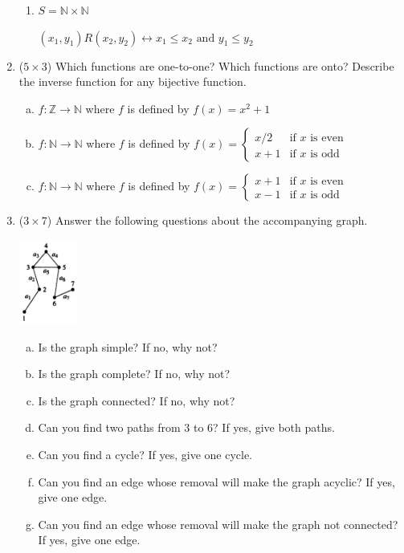 \documentclass[12pt]{article}
\newcommand{\ro}{R}
\begin{document}
\begin{enumerate}
\begin{enumerate}
						\item
						$S = \mathbb{N} \times \mathbb{N}$
						
						$\left(x_1, y_1\right) \ro \left(x_2, y_2\right) \leftrightarrow x_1 \leq x_2 \text{ and } y_1 \leq y_2$
					\end{enumerate} 
				
				
				\newpage
				\item ($5 \times 3$)
				Which functions are one-to-one? Which functions are onto? Describe the inverse function for any bijective function.
				\begin{enumerate}[a.]
					\item
					$f: \mathbb{Z} \to \mathbb{N}$ where $f$ is defined by $f\left(x\right) = x^2 +1$
					
					\item
					$f: \mathbb{N} \to \mathbb{N}$ where $f$ is defined by $f\left(x\right) = \left\lbrace 
					\begin{array}{ll}
					x/2 & \mbox{if } x \mbox{ is even } \\
					x + 1 & \mbox{if } x \mbox{ is odd } 
					\end{array}
					\right.$
					
					\item
					$f: \mathbb{N} \to \mathbb{N}$ where $f$ is defined by $f\left(x\right) = \left\lbrace 
					\begin{array}{ll}
					x + 1 & \mbox{if } x \mbox{ is even } \\
					x - 1 & \mbox{if } x \mbox{ is odd } 
					\end{array}
					\right.$
				\end{enumerate}		
			
		
		\newpage
		\item ($3 \times 7$)		
		Answer the following questions about the accompanying graph.
		\begin{center}
			\includegraphics[width=0.15\textwidth]{HW10-1}
		\end{center}			
		\begin{enumerate}[a.]
			\item			
			Is the graph simple? If no, why not?
			\item
			Is the graph complete? If no, why not?
			\item
			Is the graph connected? If no, why not?
			\item
			Can you find two paths from 3 to 6? If yes, give both paths.
			\item
			Can you find a cycle? If yes, give one cycle.
			\item
			Can you find an edge whose removal will make the graph acyclic? If yes, give one edge.
			\item
			Can you find an edge whose removal will make the graph not connected? If yes, give one edge.
		\end{enumerate}
	

\end{enumerate}
\end{document}
